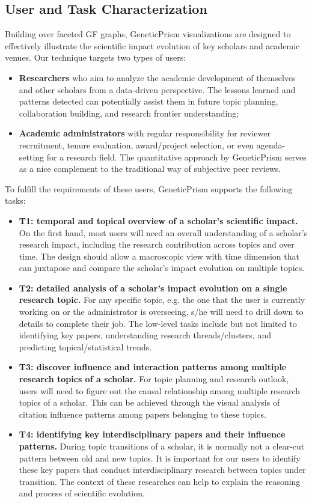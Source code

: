 \subsection{User and Task Characterization}

Building over faceted GF graphs, GeneticPrism visualizations are designed to effectively illustrate the scientific impact evolution of key scholars and academic venues. Our technique targets two types of users:
\begin{itemize}
\item \textbf{Researchers} who aim to analyze the academic development of themselves and other scholars from a data-driven perspective. The lessons learned and patterns detected can potentially assist them in future topic planning, collaboration building, and research frontier understanding;
\item \textbf{Academic administrators} with regular responsibility for reviewer recruitment, tenure evaluation, award/project selection, or even agenda-setting for a research field. The quantitative approach by GeneticPrism serves as a nice complement to the traditional way of subjective peer reviews.     
\end{itemize}

To fulfill the requirements of these users, GeneticPrism supports the following tasks:
\begin{itemize}
\item \textbf{T1: temporal and topical overview of a scholar's scientific impact.} On the first hand, most users will need an overall understanding of a scholar's research impact, including the research contribution across topics and over time. The design should allow a macroscopic view with time dimension that can juxtapose and compare the scholar's impact evolution on multiple topics.
\item \textbf{T2: detailed analysis of a scholar's impact evolution on a single research topic.} For any specific topic, e.g. the one that the user is currently working on or the administrator is overseeing, s/he will need to drill down to details to complete their job. The low-level tasks include but not limited to identifying key papers, understanding research threads/clusters, and predicting topical/statistical trends.
\item \textbf{T3: discover influence and interaction patterns among multiple research topics of a scholar.} For topic planning and research outlook, users will need to figure out the causal relationship among multiple research topics of a scholar. This can be achieved through the visual analysis of citation influence patterns among papers belonging to these topics.
\item \textbf{T4: identifying key interdisciplinary papers and their influence patterns.} During topic transitions of a scholar, it is normally not a clear-cut pattern between old and new topics. It is important for our users to identify these key papers that conduct interdisciplinary research between topics under transition. The context of these researches can help to explain the reasoning and process of scientific evolution.
\end{itemize}
